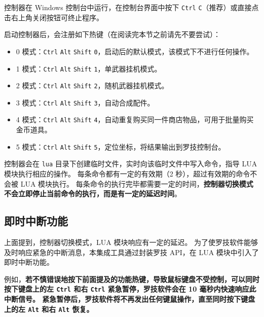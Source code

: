 控制器在 Windows 控制台中运行，在控制台界面中按下 \lstinline{Ctrl} \lstinline{C}（推荐）或直接点击右上角关闭按钮可终止程序。

启动控制器后，会注册如下热键（在阅读完本节之前请先不要尝试）：

\begin{itemize}

    \item 0 模式：\lstinline{Ctrl} \lstinline{Alt} \lstinline{Shift} \lstinline{0}，启动后的默认模式，该模式下不进行任何操作。

    \item 1 模式：\lstinline{Ctrl} \lstinline{Alt} \lstinline{Shift} \lstinline{1}，单武器挂机模式。

    \item 2 模式：\lstinline{Ctrl} \lstinline{Alt} \lstinline{Shift} \lstinline{2}，随机武器挂机模式。

    \item 3 模式：\lstinline{Ctrl} \lstinline{Alt} \lstinline{Shift} \lstinline{3}，自动合成配件。

    \item 4 模式：\lstinline{Ctrl} \lstinline{Alt} \lstinline{Shift} \lstinline{4}，自动重复购买同一件商店物品，可用于批量购买金币道具。

    \item 5 模式：\lstinline{Ctrl} \lstinline{Alt} \lstinline{Shift} \lstinline{5}，定位坐标，将结果输出到罗技控制台。

\end{itemize}

控制器会在 \lstinline{lua} 目录下创建临时文件，实时向该临时文件中写入命令，指导 LUA 模块执行相应的操作。
每条命令都有一定的有效期（2 秒），超过有效期的命令不会被 LUA 模块执行。
每条命令的执行完毕都需要一定的时间，\textbf{\color{red}控制器切换模式不会立即停止当前命令的执行，而是有一定的延迟时间}。

\subsection{即时中断功能}

上面提到，控制器切换模式，LUA 模块响应有一定的延迟。
为了使罗技软件能够及时响应紧急的中断消息，本集成工具通过封装罗技 API，在 LUA 模块中引入了即时中断功能。

例如，\textbf{\color{red}若不慎错误地按下前面提及的功能热键，导致鼠标键盘不受控制，可以同时按下键盘上的左 \lstinline{Ctrl} 和右 \lstinline{Ctrl} 紧急暂停，罗技软件会在 10 毫秒内快速响应此中断信号。
紧急暂停后，罗技软件将不再发出任何键鼠操作，直至同时按下键盘上的左 \lstinline{Alt} 和右 \lstinline{Alt} 恢复。}

